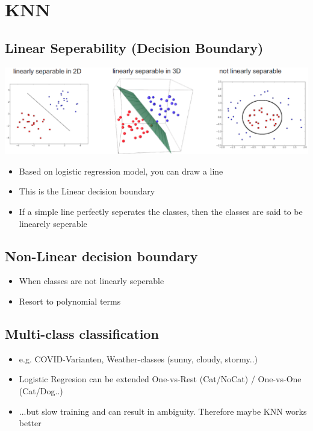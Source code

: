 \section{KNN}

\subsection{Linear Seperability (Decision Boundary)}
\includegraphics[width=1\linewidth]{./img/linear_sep.png}

\begin{itemize}
    \item Based on logistic regression model, you can draw a line
    \item This is the Linear decision boundary
    \item If a simple line perfectly seperates the classes, then the classes are said to be linearely seperable
\end{itemize}

\subsection{Non-Linear decision boundary}
\begin{itemize}
    \item When classes are not linearly seperable
    \item Resort to polynomial terms
\end{itemize}

\subsection{Multi-class classification}
\begin{itemize}
    \item e.g. COVID-Varianten, Weather-classes (sunny, cloudy, stormy..)
    \item Logistic Regresion can be extended One-vs-Rest (Cat/NoCat) / One-vs-One (Cat/Dog..)
    \item ...but slow training and can result in ambiguity. Therefore maybe KNN works better
\end{itemize}

